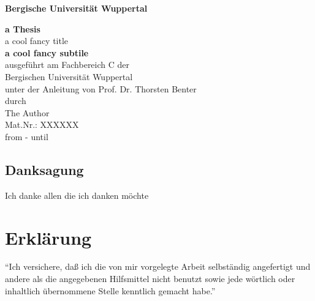 \documentclass[a4paper,titlepage,DIV11,11pt,BCOR2.5cm,headinclude,ngerman,openany,pdftex]{scrbook}
\begin{document}
\begin{titlepage}

\begin{center}
{\Large \bfseries Bergische Universität Wuppertal}

\vspace{1,0cm}
\sffamily
{\LARGE \bfseries a Thesis}\\
\vspace{1,5cm}
{\Huge  {}\selectfont  a cool fancy title}\\
\vspace{2,0cm}
{\LARGE \bfseries  a cool fancy subtile}\\
\vspace{4,0cm}
\small
ausgeführt am Fachbereich C der\\
Bergischen Universität Wuppertal\\
\vspace{1,0cm}
unter der Anleitung von Prof. Dr. Thorsten Benter\\
\vspace{,5cm}
durch\\
\vspace{,2cm}
The Author \\
Mat.Nr.: XXXXXX\\
\vspace{,5cm}
from - until\\
\end{center}
 
\end{titlepage}

\mbox{} \thispagestyle{empty} \newpage




\section*{Danksagung}
Ich danke allen die ich danken möchte

\chapter*{Erklärung}
"`Ich versichere, daß ich die von mir vorgelegte Arbeit selbständig angefertigt und andere als die angegebenen Hilfsmittel nicht benutzt sowie jede wörtlich oder inhaltlich übernommene Stelle kenntlich gemacht habe."' \\[14cm]
\end{document}
